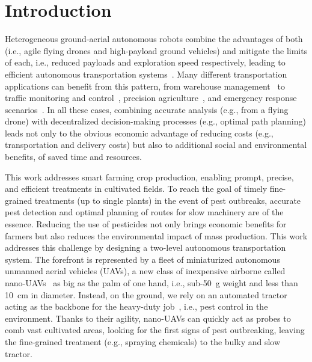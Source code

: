 \section{Introduction} \label{sec:intro}

Heterogeneous ground-aerial autonomous robots combine the advantages of both (i.e., agile flying drones and high-payload ground vehicles) and mitigate the limits of each, i.e., reduced payloads and exploration speed respectively, leading to efficient autonomous transportation systems~\cite{chatziparaschis2020aerial, 8955969}.
Many different transportation applications can benefit from this pattern, from warehouse management~\cite{inproceedings_warehouse} to traffic monitoring and control~\cite{rodic2012ambientally}, precision agriculture~\cite{9177181}, and emergency response scenarios~\cite{rajapakshe2023coll}.
In all these cases, combining accurate analysis (e.g., from a flying drone) with decentralized decision-making processes (e.g., optimal path planning) leads not only to the obvious economic advantage of reducing costs (e.g., transportation and delivery costs) but also to additional social and environmental benefits, of saved time and resources.

This work addresses smart farming crop production, enabling prompt, precise, and efficient treatments in cultivated fields.
To reach the goal of timely fine-grained treatments (up to single plants) in the event of pest outbreaks, accurate pest detection and optimal planning of routes for slow machinery are of the essence.
Reducing the use of pesticides not only brings economic benefits for farmers but also reduces the environmental impact of mass production.
This work addresses this challenge by designing a two-level autonomous transportation system.
The forefront is represented by a fleet of miniaturized autonomous unmanned aerial vehicles (UAVs), a new class of inexpensive airborne called nano-UAVs~\cite{9474262, lamberti2024sim} as big as the palm of one hand, i.e., sub-\SI{50}{\gram} weight and less than \SI{10}{\centi\meter} in diameter.
Instead, on the ground, we rely on an automated tractor acting as the backbone for the heavy-duty job~\cite{applmech3030049, tahmasebi2022autonomous}, i.e., pest control in the environment.
Thanks to their agility, nano-UAVs can quickly act as probes to comb vast cultivated areas, looking for the first signs of pest outbreaking, leaving the fine-grained treatment (e.g., spraying chemicals) to the bulky and slow tractor.

